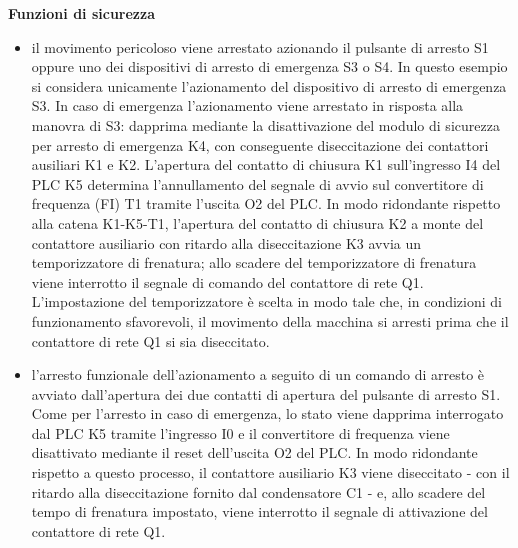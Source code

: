 \textbf{Funzioni di sicurezza}
\begin{itemize}
    \item il movimento pericoloso viene arrestato azionando il pulsante di arresto S1 oppure uno dei dispositivi di arresto di emergenza S3 o S4. In questo esempio si considera unicamente l'azionamento del dispositivo di arresto di emergenza S3. In caso di emergenza l'azionamento viene arrestato in risposta alla manovra di S3: dapprima mediante la disattivazione del modulo di sicurezza per arresto di emergenza K4, con conseguente diseccitazione dei contattori ausiliari K1 e K2. L'apertura del contatto di chiusura K1 sull'ingresso I4 del PLC K5 determina l'annullamento del segnale di avvio sul convertitore di frequenza (FI) T1 tramite l'uscita O2 del PLC. In modo ridondante rispetto alla catena K1-K5-T1, l'apertura del contatto di chiusura K2 a monte del contattore ausiliario con ritardo alla diseccitazione K3 avvia un temporizzatore di frenatura; allo scadere del temporizzatore di frenatura viene interrotto il segnale di comando del contattore di rete Q1. L'impostazione del temporizzatore è scelta in modo tale che, in condizioni di funzionamento sfavorevoli, il movimento della macchina si arresti prima che il contattore di rete Q1 si sia diseccitato.
    \item l'arresto funzionale dell'azionamento a seguito di un comando di arresto è avviato dall'apertura dei due contatti di apertura del pulsante di arresto S1. Come per l'arresto in caso di emergenza, lo stato viene dapprima interrogato dal PLC K5 tramite l'ingresso I0 e il convertitore di frequenza viene disattivato mediante il reset dell'uscita O2 del PLC. In modo ridondante rispetto a questo processo, il contattore ausiliario K3 viene diseccitato - con il ritardo alla diseccitazione fornito dal condensatore C1 - e, allo scadere del tempo di frenatura impostato, viene interrotto il segnale di attivazione del contattore di rete Q1.

\end{itemize}
